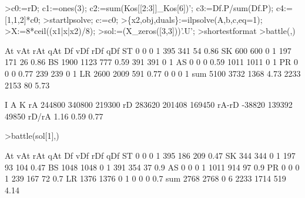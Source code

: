 \documentclass[a4paper,10pt]{article}
\begin{document}
\begin{eulernotebook}
\begin{eulerprompt}
>c0:=rD; c1:=ones(3); c2:=sum(Kos[[2:3]]_Kos[6])'; c3:=Df.P/sum(Df.P); c4:=[1,1,2]*c0;
>startlpsolve; c:=c0;
>\{x2,obj,duals\}:=ilpsolve(A,b,c,eq=1);
>X:=8*ceil((x1|x|x2)/8);
>sol:=(X_zeros([3,3]))'.U';
>shortestformat
>battle(,)
\end{eulerprompt}
\begin{euleroutput}
                    At       vAt       rAt       qAt        Df       vDf       rDf       qDf
          ST         0         0         0         1       395       341        54      0.86
          SK       600       600         0         1       197       171        26      0.86
          BS      1900      1123       777      0.59       391       391         0         1
          AS         0         0         0      0.59      1011      1011         0         1
          PR         0         0         0      0.77       239       239         0         1
          LR      2600      2009       591      0.77         0         0         0         1
         sum      5100      3732      1368      4.73      2233      2153        80      5.73
  
                     I         A         K
          rA    244800    340800    219300
          rD    283620    201408    169450
       rA-rD    -38820    139392     49850
       rD/rA      1.16      0.59      0.77
\end{euleroutput}
\begin{eulerprompt}
>battle(sol[1],)
\end{eulerprompt}
\begin{euleroutput}
                    At       vAt       rAt       qAt        Df       vDf       rDf       qDf
          ST         0         0         0         1       395       186       209      0.47
          SK       344       344         0         1       197        93       104      0.47
          BS      1048      1048         0         1       391       354        37       0.9
          AS         0         0         0         1      1011       914        97       0.9
          PR         0         0         0         1       239       167        72       0.7
          LR      1376      1376         0         1         0         0         0       0.7
         sum      2768      2768         0         6      2233      1714       519      4.14
  

\end{euleroutput}
\end{eulernotebook}
\end{document}
